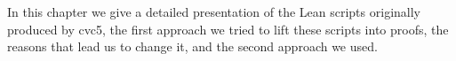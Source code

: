 In this chapter we give a detailed presentation of the Lean scripts originally produced by cvc5, the first approach we tried to lift these scripts into proofs, the reasons that lead us to change it, and the second approach we used.
